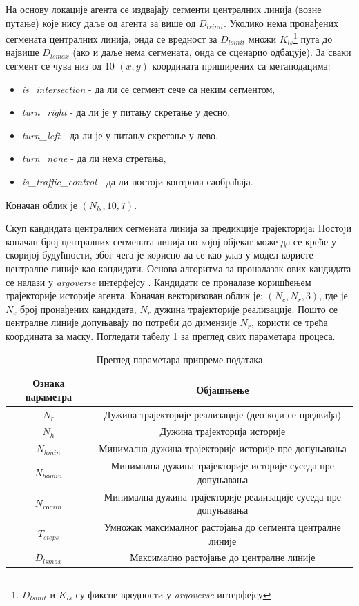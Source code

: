 \documentclass[11pt,oneside]{memoir}
\begin{document}
На основу локације агента се издвајају сегменти централних линија (возне путање) које нису даље од агента за више од $D_{lsinit}$. Уколико нема
пронађених сегмената централних линија, онда се вредност за $D_{lsinit}$ множи $K_{ls}$\footnote{$D_{lsinit}$ и $K_{ls}$ су фиксне вредности
у \textit{argoverse} интерфејсу} 
пута до највише $D_{lsmax}$ (ако и даље нема сегмената, 
онда се сценарио одбацује). За сваки сегмент се чува низ од 10 $(x, y)$ координата приширених са метаподацима:
\begin{itemize} 
  \item \textit{is\_intersection} - да ли се сегмент сече са неким сегментом,
  \item \textit{turn\_right} - да ли је у питању скретање у десно, 
  \item \textit{turn\_left} - да ли је у питању скретање у лево, 
  \item \textit{turn\_none} - да ли нема стретања, 
  \item \textit{is\_traffic\_control} - да ли постоји контрола саобраћаја. 
\end{itemize}
Коначан облик је $(N_{ls}, 10, 7)$. 

Скуп кандидата централних сегмената линија за предикције трајекторија: Постоји коначан број централних сегмената линија по којој
објекат може да се креће у скоријој будућности, због чега је корисно да се као улаз у модел користе централне линије као кандидати. 
Основа алгоритма за проналазак ових кандидата се налази у \textit{argoverse} интерфејсу \cite{argoverse}. Кандидати се проналазе
коришћењем трајекторије историје агента. Коначан векторизован облик је: $(N_c, N_r, 3)$, где је $N_c$ број пронађених кандидата,
$N_r$ дужина трајекторије реализације. Пошто се централне линије допуњавају по потреби до димензије $N_r$, користи се трећа координата
за маску. Погледати табелу \ref{dp-params-table} за преглед свих параметара процеса.

\begin{table}
  \begin{tabular}{c|c}
    Ознака параметра & Објашњење \\
    \hline
    $N_r$ & Дужина трајекторије реализације (део који се предвиђа) \\
    $N_h$ & Дужина трајекторија историје \\
    $N_{hmin}$ & Минимална дужина трајекторије историје пре допуњавања \\
    $N_{hоmin}$ & Минимална дужина трајекторије историје суседа пре допуњавања \\
    $N_{rоmin}$ & Минимална дужина трајекторије реализације суседа пре допуњавања \\
    $T_{steps}$ & Умножак максималног растојања до сегмента централне линије \\
    $D_{lsmax}$ & Максимално растојање до централне линије
  \end{tabular}
  \caption{Преглед параметара припреме података}
  \label{dp-params-table}
\end{table}
\end{document}
